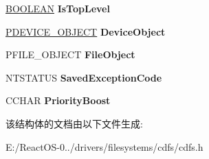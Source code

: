 \begin{DoxyCompactItemize}
\hyperlink{_processor_bind_8h_a112e3146cb38b6ee95e64d85842e380a}{B\+O\+O\+L\+E\+AN} {\bfseries Is\+Top\+Level}
\item 
\mbox{\label{struct___c_d_f_s___i_r_p___c_o_n_t_e_x_t_a62cd221b3e6f6923d6ba6a2c569d471d}} 
\hyperlink{struct___d_e_v_i_c_e___o_b_j_e_c_t}{P\+D\+E\+V\+I\+C\+E\+\_\+\+O\+B\+J\+E\+CT} {\bfseries Device\+Object}
\item 
\mbox{\label{struct___c_d_f_s___i_r_p___c_o_n_t_e_x_t_a9a02603af64d3ddfb1230c26a79175e2}} 
P\+F\+I\+L\+E\+\_\+\+O\+B\+J\+E\+CT {\bfseries File\+Object}
\item 
\mbox{\label{struct___c_d_f_s___i_r_p___c_o_n_t_e_x_t_a236fd6b6aeb0566bb92b1b9dca460dbd}} 
N\+T\+S\+T\+A\+T\+US {\bfseries Saved\+Exception\+Code}
\item 
\mbox{\label{struct___c_d_f_s___i_r_p___c_o_n_t_e_x_t_abc836eb3e21d74a53b47f2f6667082d7}} 
C\+C\+H\+AR {\bfseries Priority\+Boost}
\end{DoxyCompactItemize}


该结构体的文档由以下文件生成\+:\begin{DoxyCompactItemize}
\item 
E\+:/\+React\+O\+S-\/0../drivers/filesystems/cdfs/cdfs.\+h\end{DoxyCompactItemize}
